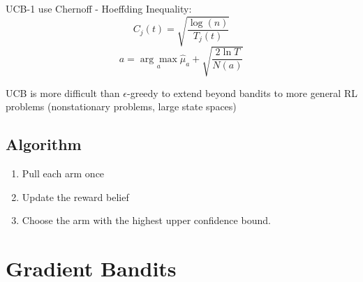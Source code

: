 \ac{UCB}-1 use Chernoff - Hoeffding Inequality:
\[ C_j(t) = \sqrt{\frac{\log(n)}{T_j(t	)}} \]
\[ a = \underset{a}{\arg\max} \widehat{\mu}_a + \sqrt{\frac{2\ln T}{N(a)}}\]

\ac{UCB} is more difficult than $\epsilon$-greedy to extend beyond bandits to more general \ac{RL} problems (nonstationary problems, large state spaces)

\subsection{Algorithm}
\begin{enumerate}
	\item Pull each arm once
	\item Update the reward belief
	\item Choose the arm with the highest upper confidence bound.
\end{enumerate}

\section{Gradient Bandits}
\todo{}